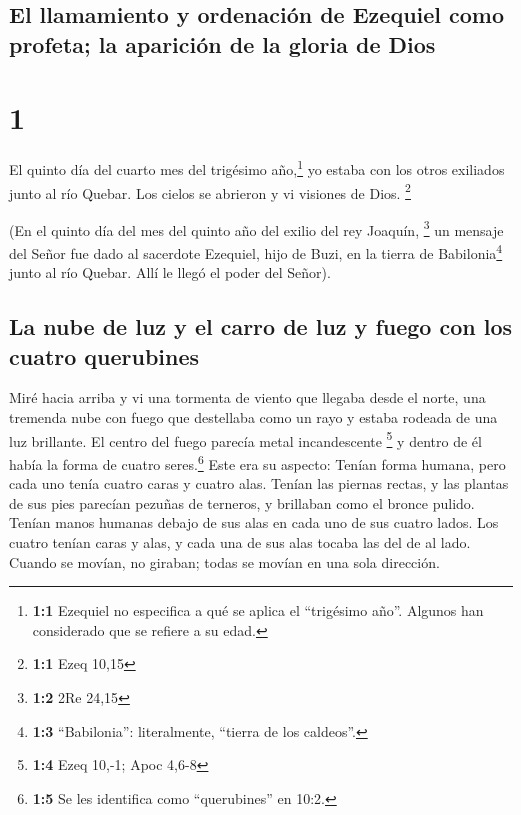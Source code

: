 \hypertarget{el-llamamiento-y-ordenaciuxf3n-de-ezequiel-como-profeta-la-apariciuxf3n-de-la-gloria-de-dios}{%
\subsection{El llamamiento y ordenación de Ezequiel como profeta; la
aparición de la gloria de
Dios}\label{el-llamamiento-y-ordenaciuxf3n-de-ezequiel-como-profeta-la-apariciuxf3n-de-la-gloria-de-dios}}

\hypertarget{section}{%
\section{1}\label{section}}

 El quinto día del cuarto mes del trigésimo
año,\footnote{\textbf{1:1} Ezequiel no especifica a qué se aplica el
  ``trigésimo año''. Algunos han considerado que se refiere a su edad.}
yo estaba con los otros exiliados junto al río Quebar. Los cielos se
abrieron y vi visiones de Dios. \footnote{\textbf{1:1} Ezeq 10,15}

 (En el quinto día del mes del quinto año del exilio del
rey Joaquín, \footnote{\textbf{1:2} 2Re 24,15}  un mensaje
del Señor fue dado al sacerdote Ezequiel, hijo de Buzi, en la tierra de
Babilonia\footnote{\textbf{1:3} ``Babilonia'': literalmente, ``tierra de
  los caldeos''.} junto al río Quebar. Allí le llegó el poder del
Señor).

\hypertarget{la-nube-de-luz-y-el-carro-de-luz-y-fuego-con-los-cuatro-querubines}{%
\subsection{La nube de luz y el carro de luz y fuego con los cuatro
querubines}\label{la-nube-de-luz-y-el-carro-de-luz-y-fuego-con-los-cuatro-querubines}}

 Miré hacia arriba y vi una tormenta de viento que llegaba
desde el norte, una tremenda nube con fuego que destellaba como un rayo
y estaba rodeada de una luz brillante. El centro del fuego parecía metal
incandescente \footnote{\textbf{1:4} Ezeq 10,-1; Apoc 4,6-8}
 y dentro de él había la forma de cuatro seres.\footnote{\textbf{1:5}
  Se les identifica como ``querubines'' en 10:2.} Este era su aspecto:
Tenían forma humana,  pero cada uno tenía cuatro caras y
cuatro alas.  Tenían las piernas rectas, y las plantas de
sus pies parecían pezuñas de terneros, y brillaban como el bronce
pulido.  Tenían manos humanas debajo de sus alas en cada
uno de sus cuatro lados. Los cuatro tenían caras y alas, 
y cada una de sus alas tocaba las del de al lado. Cuando se movían, no
giraban; todas se movían en una sola dirección.

